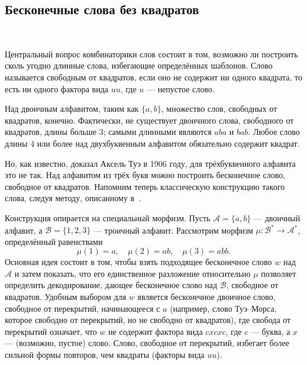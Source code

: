 \documentclass[a4paper,14pt]{extreport}
\theoremstyle{plain}
\theoremstyle{definition}
\theoremstyle{remark}
\begin{document}
\subsection{Бесконечные слова без квадратов}~\label{sec2.1.3}

Центральный вопрос комбинаторики слов состоит в том, возможно ли построить сколь угодно длинные слова, избегающие определённых шаблонов. Слово называется свободным от квадратов, если оно не содержит ни одного квадрата, то есть ни одного фактора вида $uu$, где $u$ --- непустое слово.

Над двоичным алфавитом, таким как $\{a,b\}$, множество слов, свободных от квадратов, конечно. Фактически, не существует двоичного слова, свободного от квадратов, длины больше $3$; самыми длинными являются $aba$ и $bab$. Любое слово длины $4$ или более над двухбуквенным алфавитом обязательно содержит квадрат. 

Но, как известно, доказал Аксель Туэ в 1906 году, для трёхбуквенного алфавита это не так. Над алфавитом из трёх букв можно построить бесконечное слово, свободное от квадратов. Напомним теперь классическую конструкцию такого слова, следуя методу, описанному в~\cite{Lothaire}. 

Конструкция опирается на специальный морфизм. Пусть $\mathcal{A} = \{a,b\}$ --- двоичный алфавит, а $\mathcal{B} = \{1,2,3\}$ --- троичный алфавит. Рассмотрим морфизм $\mu : \mathcal{B}^* \to \mathcal{A}^*$, определённый равенствами
\begin{equation}
	\mu(1) = a,\quad \mu(2) = ab,\quad \mu(3) = abb.
\end{equation}
Основная идея состоит в том, чтобы взять подходящее бесконечное слово $w$ над $\mathcal{A}$ и затем показать, что его единственное разложение относительно $\mu$ позволяет определить декодирование, дающее бесконечное слово над $\mathcal{B}$, свободное от квадратов. Удобным выбором для $w$ является бесконечное двоичное слово, свободное от перекрытий, начинающееся с $a$ (например, слово Туэ--Морса, которое свободно от перекрытий, но не свободно от квадратов), где свобода от перекрытий означает, что $w$ не содержит фактора вида $cxcxc$, где $c$ --- буква, а $x$ --- (возможно, пустое) слово. Слово, свободное от перекрытий, избегает более сильной формы повторов, чем квадраты (факторы вида $uu$).
\end{document}
